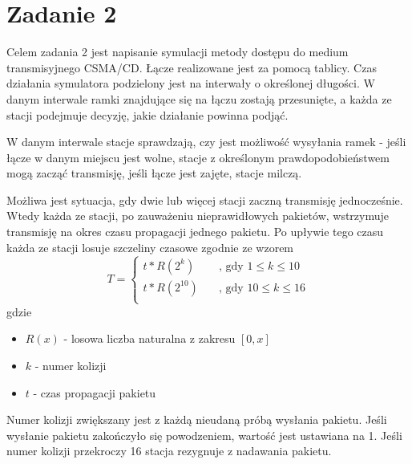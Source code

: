 \documentclass[titlepage]{article}
\begin{document}
\section{Zadanie 2}
Celem zadania 2 jest napisanie symulacji metody dostępu do medium transmisyjnego CSMA/CD. Łącze realizowane jest za pomocą tablicy. Czas działania symulatora podzielony jest na interwały o określonej długości. W danym interwale ramki znajdujące się na łączu zostają przesunięte, a każda ze stacji podejmuje decyzję, jakie działanie powinna podjąć. 

W danym interwale stacje sprawdzają, czy jest możliwość wysyłania ramek - jeśli łącze w danym miejscu jest wolne, stacje z określonym prawdopodobieństwem mogą zacząć transmisję, jeśli łącze jest zajęte, stacje milczą.

Możliwa jest sytuacja, gdy dwie lub więcej stacji zaczną transmisję jednocześnie. Wtedy każda ze stacji, po zauważeniu nieprawidłowych pakietów, wstrzymuje transmisję na okres czasu propagacji jednego pakietu. Po upływie tego czasu każda ze stacji losuje szczeliny czasowe zgodnie ze wzorem 
\newpage
\[   
T = 
     \begin{cases}
       t * R(2^k) &\quad\text{, gdy }1 \leq k \leq 10\\
       t * R(2^{10}) &\quad\text{, gdy }10 \leq k \leq 16\\
     \end{cases}
\]
gdzie
\begin{itemize}
\itemsep0em
\item $R(x)$ - losowa liczba naturalna z zakresu $[0, x]$
\item $k$ - numer kolizji
\item $t$ - czas propagacji pakietu
\end{itemize}
Numer kolizji zwiększany jest z każdą nieudaną próbą wysłania pakietu. Jeśli wysłanie pakietu zakończyło się powodzeniem, wartość jest ustawiana na 1. Jeśli numer kolizji przekroczy 16 stacja rezygnuje z nadawania pakietu.
\end{document}
